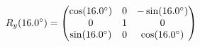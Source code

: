 \documentclass[preview]{standalone}
\begin{document}
\begin{align*}
\special{dvisvgm:raw <g id='unique000'>}R_y(16.0^\circ) = \begin{pmatrix} \cos(16.0^\circ) & 0 & -\sin(16.0^\circ) \\ 0 & 1 & 0 \\ \sin(16.0^\circ) & 0 & \cos(16.0^\circ) \end{pmatrix}\special{dvisvgm:raw </g>}
\end{align*}
\end{document}

